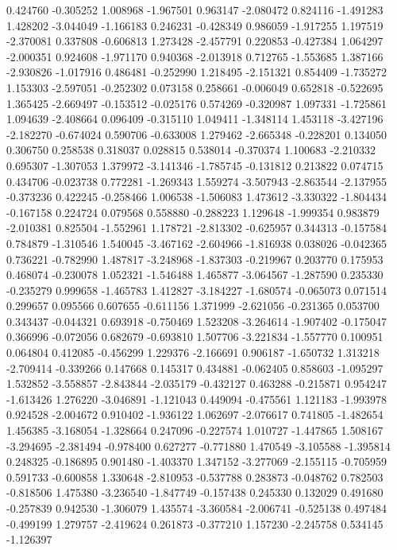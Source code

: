 0.424760
-0.305252
1.008968
-1.967501
0.963147
-2.080472
0.824116
-1.491283
1.428202
-3.044049
-1.166183
0.246231
-0.428349
0.986059
-1.917255
1.197519
-2.370081
0.337808
-0.606813
1.273428
-2.457791
0.220853
-0.427384
1.064297
-2.000351
0.924608
-1.971170
0.940368
-2.013918
0.712765
-1.553685
1.387166
-2.930826
-1.017916
0.486481
-0.252990
1.218495
-2.151321
0.854409
-1.735272
1.153303
-2.597051
-0.252302
0.073158
0.258661
-0.006049
0.652818
-0.522695
1.365425
-2.669497
-0.153512
-0.025176
0.574269
-0.320987
1.097331
-1.725861
1.094639
-2.408664
0.096409
-0.315110
1.049411
-1.348114
1.453118
-3.427196
-2.182270
-0.674024
0.590706
-0.633008
1.279462
-2.665348
-0.228201
0.134050
0.306750
0.258538
0.318037
0.028815
0.538014
-0.370374
1.100683
-2.210332
0.695307
-1.307053
1.379972
-3.141346
-1.785745
-0.131812
0.213822
0.074715
0.434706
-0.023738
0.772281
-1.269343
1.559274
-3.507943
-2.863544
-2.137955
-0.373236
0.422245
-0.258466
1.006538
-1.506083
1.473612
-3.330322
-1.804434
-0.167158
0.224724
0.079568
0.558880
-0.288223
1.129648
-1.999354
0.983879
-2.010381
0.825504
-1.552961
1.178721
-2.813302
-0.625957
0.344313
-0.157584
0.784879
-1.310546
1.540045
-3.467162
-2.604966
-1.816938
0.038026
-0.042365
0.736221
-0.782990
1.487817
-3.248968
-1.837303
-0.219967
0.203770
0.175953
0.468074
-0.230078
1.052321
-1.546488
1.465877
-3.064567
-1.287590
0.235330
-0.235279
0.999658
-1.465783
1.412827
-3.184227
-1.680574
-0.065073
0.071514
0.299657
0.095566
0.607655
-0.611156
1.371999
-2.621056
-0.231365
0.053700
0.343437
-0.044321
0.693918
-0.750469
1.523208
-3.264614
-1.907402
-0.175047
0.366996
-0.072056
0.682679
-0.693810
1.507706
-3.221834
-1.557770
0.100951
0.064804
0.412085
-0.456299
1.229376
-2.166691
0.906187
-1.650732
1.313218
-2.709414
-0.339266
0.147668
0.145317
0.434881
-0.062405
0.858603
-1.095297
1.532852
-3.558857
-2.843844
-2.035179
-0.432127
0.463288
-0.215871
0.954247
-1.613426
1.276220
-3.046891
-1.121043
0.449094
-0.475561
1.121183
-1.993978
0.924528
-2.004672
0.910402
-1.936122
1.062697
-2.076617
0.741805
-1.482654
1.456385
-3.168054
-1.328664
0.247096
-0.227574
1.010727
-1.447865
1.508167
-3.294695
-2.381494
-0.978400
0.627277
-0.771880
1.470549
-3.105588
-1.395814
0.248325
-0.186895
0.901480
-1.403370
1.347152
-3.277069
-2.155115
-0.705959
0.591733
-0.600858
1.330648
-2.810953
-0.537788
0.283873
-0.048762
0.782503
-0.818506
1.475380
-3.236540
-1.847749
-0.157438
0.245330
0.132029
0.491680
-0.257839
0.942530
-1.306079
1.435574
-3.360584
-2.006741
-0.525138
0.497484
-0.499199
1.279757
-2.419624
0.261873
-0.377210
1.157230
-2.245758
0.534145
-1.126397
